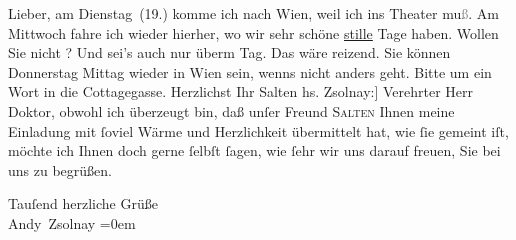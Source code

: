 \pstart{}Lieber,\pend\vspace{0.5em}
\pstart
           am Dienstag (19.) komme ich nach Wien, weil ich ins Theater mu\textcolor{gray}{ß}. Am Mittwoch fahre ich wieder hierher, wo wir sehr schöne \uline{stille} Tage haben. Wollen Sie nicht \label{K_L02793-1v}\label{K_L02793-1}?
               Und sei’s auch nur überm Tag. Das wäre reizend. Sie können Donnerstag{ }Mittag wieder in Wien sein, wenns
               nicht anders geht. Bitte um ein Wort in die Cottagegasse.\pend
           \pstart Herzlichst Ihr \spacefill\mbox{Salten}\pend{}\vspace{1em}{\vspace{1\baselineskip}}
\pstart{}{[}hs. Zsolnay:{]} Verehrter Herr Doktor,\pend\vspace{0.5em}
\pstart
           obwohl ich überzeugt bin, daß unſer Freund \textsc{Salten} Ihnen
               meine Einladung mit{ }ſoviel Wärme und Herzlichkeit übermittelt hat, wie{ }ſie gemeint
               iſt, möchte ich Ihnen doch gerne{ }ſelbſt{ }ſagen, wie{ }ſehr {\pb}wir uns darauf freuen, Sie bei
               uns zu begrüßen.\pend
           
\pstart
           Tauſend herzliche Grüße {\\[\baselineskip]}\spacefill\mbox{Andy Zsolnay}\pend
           \leftskip=0em{}\endnumbering{}  \newcommand{\dateiname}{L02793}\newcommand{\titel}{Felix Salten und Amanda Zsolnay an Arthur Schnitzler, 15. 6. 1923}\newcommand{\editorInnen}{Martin Anton Müller und Laura Untner}

